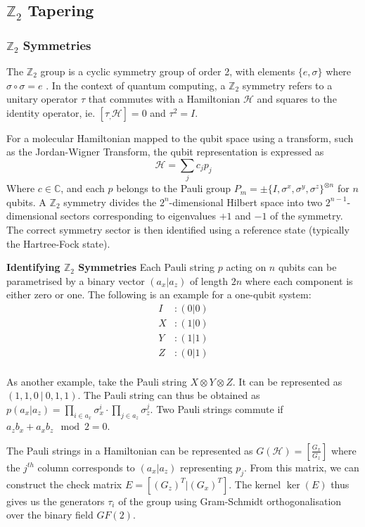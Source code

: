 \documentclass{article}
\newcommand{\ham}{\mathcal{H}}
\newcommand{\zsym}{\mathbb{Z}_2}
\renewcommand{\th}[1]{#1^{th}}
\begin{document}
\subsection{$\zsym$ Tapering}
\subsubsection{$\zsym$ Symmetries}\label{ssec:zsym}
The $\zsym$ group is a cyclic symmetry group of order 2, with elements $\{e, \sigma\}$ where $\sigma\circ\sigma = e$ \cite{Moore2014}. In the context of quantum computing, a $\zsym$ symmetry refers to a unitary operator $\tau$ that commutes with a Hamiltonian $\ham$ and squares to the identity operator, ie. $[\tau_, \ham] = 0$ and $\tau^2 =I$.

For a molecular Hamiltonian mapped to the qubit space using a transform, such as the Jordan-Wigner Transform, the qubit representation is expressed as \begin{equation}\label{eq:hamdef}
    \ham=\sum_jc_j p_j
\end{equation}
Where $c \in \mathbb{C}$, and each $p$ belongs to the Pauli group $P_m = \pm\{I, \sigma^x, \sigma^y, \sigma^z\}^{\otimes n}$ for $n$ qubits. A $\zsym$ symmetry divides the $2^n$-dimensional Hilbert space into two $2^{n-1}$-dimensional sectors corresponding to eigenvalues $+1$ and $-1$ of the symmetry. The correct symmetry sector is then identified using a reference state (typically the Hartree-Fock state).

\textbf{Identifying $\zsym$ Symmetries}
Each Pauli string $p$ acting on $n$ qubits can be parametrised by a binary vector $(a_x|a_z)$ of length $2n$ where each component is either zero or one. The following is an example for a one-qubit system:
\begin{align*}
    I&: (0|0)\\
    X&: (1 | 0)\\
    Y&: (1| 1)\\
    Z&: (0|1)
\end{align*}\\
As another example, take the Pauli string $X \otimes Y \otimes Z$. It can be represented as $(1, 1, 0~|~ 0, 1, 1)$. The Pauli string can thus be obtained as $p(a_x|a_z) = \prod_{i\in a_x}\sigma^i_x \cdot \prod_{j\in a_z}\sigma^j_z$. Two Pauli strings commute if $a_zb_x + a_xb_z \mod 2= 0$\cite{setiaReducingQubitRequirements2020}. 

The Pauli strings in a Hamiltonian can be represented as $G(\ham) = \left[\frac{G_x}{G_z}\right]$ where the $\th{j}$ column corresponds to $(a_x | a_z)$ representing $p_j$. From this matrix, we can construct the check matrix $E = [(G_z)^T | (G_x)^T]$. The kernel $\ker(E)$ thus gives us the generators $\tau_i$ of the group using Gram-Schmidt orthogonalisation over the binary field $GF(2)$.
\end{document}
